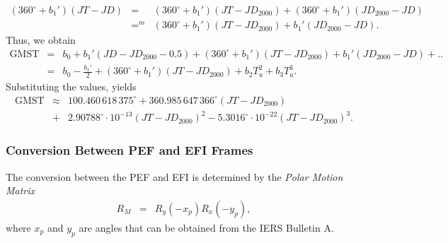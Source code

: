 \documentclass [12pt, a4paper] {article}
\begin{document}
\begin {eqnarray}
  (360^\circ + b_1')(JT - JD)
  &=& \nonumber
  (360^\circ + b_1') (JT - JD_{2000}) + (360^\circ + b_1')(JD_{2000} - JD)\\
  &=^m& \nonumber
  (360^\circ + b_1') (JT - JD_{2000}) + b_1'(JD_{2000} - JD).
\end {eqnarray}
Thus, we obtain
\begin {eqnarray}
  \textrm{GMST} &=&
  b_0 + b_1'(JD - JD_{2000} - 0.5) + (360^\circ + b_1')(JT - JD_{2000}) + b_1'(JD_{2000} - JD)
  + ..
  \nonumber 
  \\ &=& 
  b_0 - \frac{b_1'}{2} + (360^\circ + b_1')(JT - JD_{2000}) + b_2T_u^2 + b_3T_u^3.
\end {eqnarray}
Substituting the values, yields 
\begin {eqnarray}
  \label{eq:GMST_expansion}
  \textrm{GMST}
  &\approx&
  100.460\,618\,375^\circ + 360.985\,647\,366^\circ(JT - JD_{2000})\\
   &+& 2.90788^\circ\cdot10^{-13} (JT - JD_{2000})^2 - 5.3016^\circ\cdot 10^{-22}(JT - JD_{2000})^3.
\end {eqnarray}
\subsubsection{Conversion Between PEF and EFI Frames}
The conversion between the PEF and EFI is determined by the \emph{Polar Motion Matrix}
\begin {eqnarray}
  R_M &=& R_y(-x_p)R_x(-y_p),
\end {eqnarray}
where $x_p$ and $y_p$ are angles that can be obtained from the IERS Bulletin A.
\end{document}
